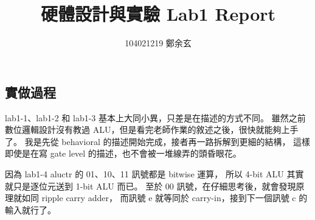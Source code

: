 \documentclass{article}
\begin{document}
\begin{CJK}{UTF8}{bsmi}
\title{硬體設計與實驗 Lab1 Report}
\author{
104021219 鄭余玄
}
\date{}
\maketitle
\section{實做過程}
lab1-1、lab1-2 和 lab1-3 基本上大同小異，只差是在描述的方式不同。
雖然之前數位邏輯設計沒有教過 ALU，但是看完老師作業的敘述之後，很快就能夠上手了。
我是先從 behavioral 的描述開始完成，接者再一路拆解到更細的結構，
這樣即使是在寫 gate level 的描述，也不會被一堆線弄的頭昏眼花。

因為 lab1-4 aluctr 的 01、10、11 訊號都是 bitwise 運算，
所以 4-bit ALU 其實就只是逐位元送到 1-bit ALU 而已。
至於 00 訊號，在仔細思考後，就會發現原理就如同 ripple carry adder，
而訊號 e 就等同於 carry-in，接到下一個訊號 c 的輸入就行了。


\end{CJK}
\end{document}
